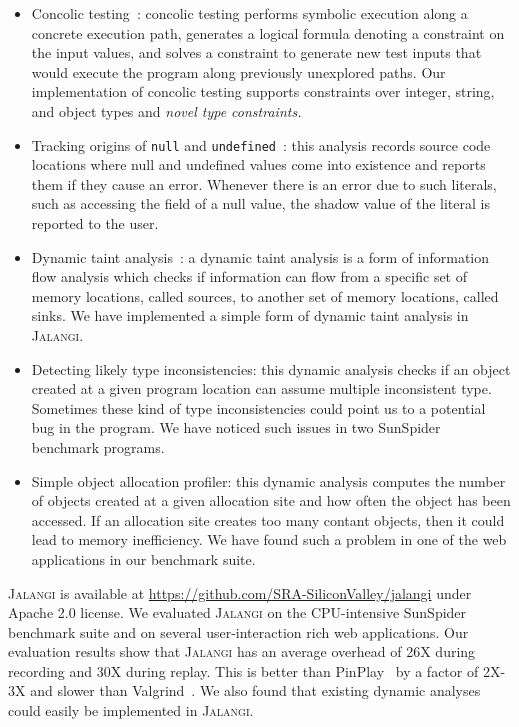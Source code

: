 \documentclass{sig-alternate}
\def\jalangi{\textsc{Jalangi}}
\begin{document}
\begin{itemize}
\item Concolic testing~\cite{dart,cute}: concolic testing performs
  symbolic execution along a concrete execution path, generates a
  logical formula denoting a constraint on the input values, and
  solves a constraint to generate new test inputs that would execute
  the program along previously unexplored paths.  Our implementation
  of concolic testing supports constraints over integer, string, and
  object types and \emph{novel type constraints.}
\item Tracking origins of \texttt{null} and
  \texttt{undefined}~\cite{Bond:2007:TBA:1297027.1297057}: this
  analysis records source code locations where null and undefined
  values come into existence and reports them if they cause an error.
  Whenever there is an error due to such literals, such as accessing
  the field of a null value, the shadow value of the literal is
  reported to the user.
\item Dynamic taint
  analysis~\cite{songndss05,Clause:2007:DGD:1273463.1273490}: a
  dynamic taint analysis is a form of information flow analysis which
  checks if information can flow from a specific set of memory
  locations, called sources, to another set of memory locations,
  called sinks.  We have implemented a simple form of dynamic taint
  analysis in \jalangi{}.
\item Detecting likely type inconsistencies: this dynamic analysis
  checks if an object created at a given program location can assume
  multiple inconsistent type.  Sometimes these kind of type
  inconsistencies could point us to a potential bug in the program.
  We have noticed such issues in two SunSpider benchmark programs.
\item Simple object allocation profiler: this dynamic analysis
  computes the number of objects created at a given allocation site
  and how often the object has been accessed.  If an allocation site
  creates too many contant objects, then it could lead to memory
  inefficiency.  We have found such a problem in one of the web
  applications in our benchmark suite.
\end{itemize}

\jalangi{} is available at
\url{https://github.com/SRA-SiliconValley/jalangi} under Apache 2.0
license.  We evaluated \jalangi{} on the CPU-intensive SunSpider
benchmark suite and on several user-interaction rich web applications.
Our evaluation results show that \jalangi{} has an average overhead of
26X during recording and 30X during replay.  This is better than
PinPlay~\cite{Patil:2010:PFD:1772954.1772958} by a factor of 2X-3X and
slower than Valgrind~\cite{Nethercote:2007:VFH:1250734.1250746}.  We
also found that existing dynamic analyses could easily be implemented
in \jalangi{}.  
\end{document}
